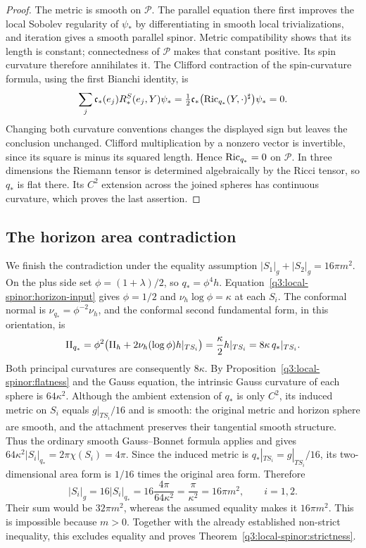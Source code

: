 \begin{proof}
The metric is smooth on $\mathcal P$.  The parallel equation
there first improves the local Sobolev regularity of $\psi_*$
by differentiating in smooth local trivializations, and iteration
gives a smooth parallel spinor.  Metric compatibility shows that
its length is constant; connectedness of $\mathcal P$ makes that
constant positive.  Its spin curvature therefore annihilates it.
The Clifford contraction of the spin-curvature formula, using
the first Bianchi identity, is
\[
 \sum_j\mathfrak c_*(e_j)R^S_*(e_j,Y)\psi_*
       =\tfrac12\mathfrak c_*
          \bigl(\operatorname{Ric}_{q_*}(Y,\cdot)^{\sharp}\bigr)\psi_*=0.
\]
Changing both curvature conventions changes the displayed sign
but leaves the conclusion unchanged.  Clifford multiplication by
a nonzero vector is invertible, since its square is minus its
squared length.  Hence $\operatorname{Ric}_{q_*}=0$ on $\mathcal P$.
In three dimensions the Riemann tensor is determined algebraically
by the Ricci tensor, so $q_*$ is flat there.  Its $C^2$ extension
across the joined spheres has continuous curvature, which proves
the last assertion.
\end{proof}

\subsection{The horizon area contradiction}

We finish the contradiction under the equality assumption
$|S_1|_g+|S_2|_g=16\pi m^2$.  On the plus side set
$\phi=(1+\lambda)/2$, so $q_*=\phi^4h$.
Equation~\eqref{q3:local-spinor:horizon-input} gives
$\phi=1/2$ and $\nu_h\log\phi=\kappa$ at each $S_i$.
The conformal normal is $\nu_{q_*}=\phi^{-2}\nu_h$, and the
conformal second fundamental form, in this orientation, is
\begin{equation}\label{q3:local-spinor:shape}
 \mathrm{II}_{q_*}
 =\phi^2\bigl(\mathrm{II}_h+2\nu_h(\log\phi)h|_{TS_i}\bigr)
 =\frac\kappa2h|_{TS_i}
 =8\kappa\,q_*|_{TS_i}.
\end{equation}
Both principal curvatures are consequently $8\kappa$.
By Proposition~\ref{q3:local-spinor:flatness} and the Gauss equation,
the intrinsic Gauss curvature of each sphere is $64\kappa^2$.
Although the ambient extension of $q_*$ is only $C^2$, its induced
metric on $S_i$ equals $g|_{TS_i}/16$ and is smooth: the original
metric and horizon sphere are smooth, and the attachment preserves
their tangential smooth structure. Thus the ordinary smooth
Gauss--Bonnet formula applies \cite[Section~1]{Chern1944} and gives
$64\kappa^2|S_i|_{q_*}=2\pi\chi(S_i)=4\pi$.  Since the induced metric is
$q_*|_{TS_i}=g|_{TS_i}/16$, its two-dimensional area form is
$1/16$ times the original area form.  Therefore
\begin{equation}\label{q3:local-spinor:individual-area}
 |S_i|_g=16|S_i|_{q_*}
       =16\frac{4\pi}{64\kappa^2}
       =\frac\pi{\kappa^2}=16\pi m^2,
 \qquad i=1,2.
\end{equation}
Their sum would be $32\pi m^2$, whereas the assumed equality
makes it $16\pi m^2$.  This is impossible because $m>0$.
Together with the already established non-strict inequality,
this excludes equality and proves
Theorem~\ref{q3:local-spinor:strictness}.
